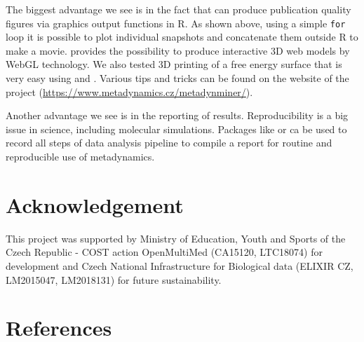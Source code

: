 The biggest advantage we see is in the fact that
 can produce publication quality figures
via graphics output functions in R. As shown above,
using a simple \texttt{for} loop it is possible to plot
individual snapshots and concatenate them outside R
to make a movie.  provides the possibility
to produce interactive 3D web models by WebGL technology.
We also tested 3D printing of a free energy surface that
is very easy using  and .
Various tips and tricks can be found
on the website of the project
(\url{https://www.metadynamics.cz/metadynminer/}).

Another advantage we see is in the reporting of results. Reproducibility
is a big issue in science, including molecular simulations.
Packages like  or  ca be
used to record all steps of data analysis pipeline to compile
a report for routine and reproducible use of metadynamics.

\hypertarget{acknowledgement}{%
\section{Acknowledgement}\label{acknowledgement}}

This project was supported by Ministry of Education, Youth and
Sports of the Czech Republic - COST action OpenMultiMed
(CA15120, LTC18074) for development and Czech National
Infrastructure for Biological data (ELIXIR CZ, LM2015047,
LM2018131)
for future sustainability.

\hypertarget{references}{%
\section*{References}\label{references}}

